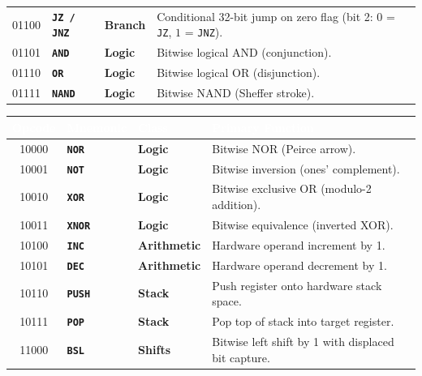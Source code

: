 \documentclass[11pt,a4paper]{article}
\begin{document}
\begin{tabularx}{\textwidth}{@{}c l l >{\raggedright\arraybackslash}X@{}}
01100 & \texttt{\textbf{JZ / JNZ}}  & \textcolor{limdark}{\textbf{Branch}}  & Conditional 32-bit jump on zero flag (bit 2: \(0\) = \texttt{JZ}, \(1\) = \texttt{JNZ}). \\
01101 & \texttt{\textbf{AND}}  & \textcolor{limdark}{\textbf{Logic}}        & Bitwise logical AND (conjunction). \\
01110 & \texttt{\textbf{OR}}   & \textcolor{limdark}{\textbf{Logic}}        & Bitwise logical OR (disjunction). \\
01111 & \texttt{\textbf{NAND}} & \textcolor{limdark}{\textbf{Logic}}        & Bitwise NAND (Sheffer stroke). \\
\bottomrule
\end{tabularx}

\clearpage
\noindent
\begin{tabularx}{\textwidth}{@{}c l l >{\raggedright\arraybackslash}X@{}}
\toprule
\rowcolor{limslate}
\textcolor{white}{\textbf{Opcode}} & \textcolor{white}{\textbf{Mnemonic}} & \textcolor{white}{\textbf{Class}} & \textcolor{white}{\textbf{Primary Function}} \\
\midrule
\rowcolors{2}{limroweven}{white}
10000 & \texttt{\textbf{NOR}}        & \textcolor{limdark}{\textbf{Logic}}        & Bitwise NOR (Peirce arrow). \\
10001 & \texttt{\textbf{NOT}}        & \textcolor{limdark}{\textbf{Logic}}        & Bitwise inversion (ones' complement). \\
10010 & \texttt{\textbf{XOR}}        & \textcolor{limdark}{\textbf{Logic}}        & Bitwise exclusive OR (modulo-2 addition). \\
10011 & \texttt{\textbf{XNOR}}       & \textcolor{limdark}{\textbf{Logic}}        & Bitwise equivalence (inverted XOR). \\
10100 & \texttt{\textbf{INC}}        & \textcolor{limorangeaccent}{\textbf{Arithmetic}} & Hardware operand increment by 1. \\
10101 & \texttt{\textbf{DEC}}        & \textcolor{limorangeaccent}{\textbf{Arithmetic}} & Hardware operand decrement by 1. \\
10110 & \texttt{\textbf{PUSH}}       & \textcolor{limdark}{\textbf{Stack}}        & Push register onto hardware stack space. \\
10111 & \texttt{\textbf{POP}}        & \textcolor{limdark}{\textbf{Stack}}        & Pop top of stack into target register. \\
11000 & \texttt{\textbf{BSL}}        & \textcolor{limorangeaccent}{\textbf{Shifts}}     & Bitwise left shift by 1 with displaced bit capture. \\

\end{tabularx}
\end{document}
